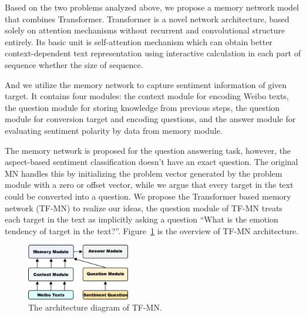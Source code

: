 \documentclass{ieeeaccess}
\begin{document}
Based on the two problems analyzed above, we propose a memory network model that combines Transformer. Transformer is a novel network architecture, based solely on attention mechanisms without recurrent and convolutional structure entirely. Its basic unit is self-attention mechanism which can obtain better context-dependent text representation using interactive calculation in each part of sequence whether the size of sequence.

And we utilize the memory network to capture sentiment information of given target. It contains four modules: the context module for encoding Weibo texts, the question module for storing knowledge from previous steps, the question module for conversion target and encoding questions, and the answer module for evaluating sentiment polarity by data from memory module.

The memory network is proposed for the question answering task, however, the aspect-based sentiment classification doesn’t have an exact question. The original MN handles this by initializing the problem vector generated by the problem module with a zero or offset vector, while we argue that every target in the text could be converted into a question. We propose the Transformer based memory network (TF-MN) to realize our ideas, the question module of TF-MN treats each target in the text as implicitly asking a question “What is the emotion tendency of target in the text?”. Figure~\ref{TF-MN} is the overview of TF-MN architecture.

\begin{figure}[htb]
	\includegraphics[width=0.4\textwidth]{TF-MN.png}
	\centering
	\caption{The architecture diagram of TF-MN.}\label{TF-MN}
\end{figure}



\EOD
\end{document}
